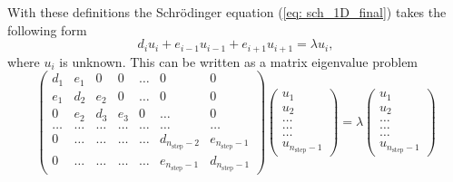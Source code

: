 \documentclass[11pt,a4wide]{article}
\begin{document}
With these definitions the Schr\"odinger equation (\ref{eq: sch_1D_final}) takes the following form
\begin{equation}
d_iu_i+e_{i-1}u_{i-1}+e_{i+1}u_{i+1}  = \lambda u_i,
\label{eq: sch_1d_descrete}
\end{equation}
where $u_i$ is unknown. This can be written as a matrix eigenvalue problem
\begin{equation}
    \left( \begin{array}{ccccccc} d_1 & e_1 & 0   & 0    & \dots  &0     & 0 \\
                                e_1 & d_2 & e_2 & 0    & \dots  &0     &0 \\
                                0   & e_2 & d_3 & e_3  &0       &\dots & 0\\
                                \dots  & \dots & \dots & \dots  &\dots      &\dots & \dots\\
                                0   & \dots & \dots & \dots  &\dots       &d_{n_{\mathrm{step}}-2} & e_{n_{\mathrm{step}}-1}\\
                                0   & \dots & \dots & \dots  &\dots       &e_{n_{\mathrm{step}}-1} & d_{n_{\mathrm{step}}-1}

             \end{array} \right)      \left( \begin{array}{c} u_{1} \\
                                                              u_{2} \\
                                                              \dots\\ \dots\\ \dots\\
                                                              u_{n_{\mathrm{step}}-1}
             \end{array} \right)=\lambda \left( \begin{array}{c} u_{1} \\
                                                              u_{2} \\
                                                              \dots\\ \dots\\ \dots\\
                                                              u_{n_{\mathrm{step}}-1}
             \end{array} \right) 
      \label{eq:sematrix}
\end{equation} 
\end{document}
